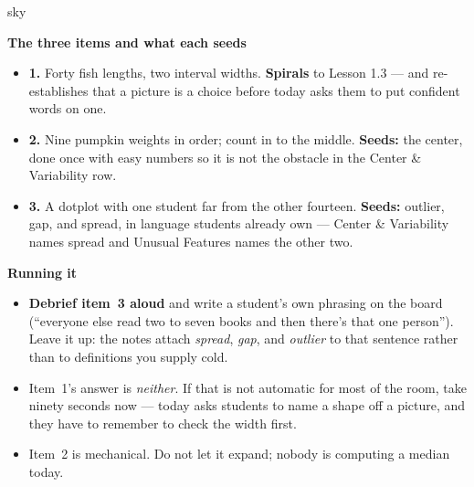 \documentclass[10pt]{article}
\begin{document}
\boxguard[20]
\begin{skillbox}{sky}
\begin{minipage}[t]{0.48\linewidth}
    \textbf{The three items and what each seeds}
    \begin{itemize}
        \item \textbf{1.} Forty fish lengths, two interval widths. \textbf{Spirals} to Lesson
              1.3 --- and re-establishes that a picture is a choice before today asks them to
              put confident words on one.
        \item \textbf{2.} Nine pumpkin weights in order; count in to the middle.
              \textbf{Seeds:} the center, done once with easy numbers so it is not the obstacle
              in the Center \& Variability row.
        \item \textbf{3.} A dotplot with one student far from the other fourteen.
              \textbf{Seeds:} outlier, gap, and spread, in language students already own ---
              Center \& Variability names spread and Unusual Features names the other two.
    \end{itemize}
\end{minipage}
\hfill
\begin{minipage}[t]{0.48\linewidth}
    \textbf{Running it}
    \begin{itemize}
        \item \textbf{Debrief item~3 aloud} and write a student's own phrasing on the board
              (``everyone else read two to seven books and then there's that one
              person''). Leave it up: the notes attach \emph{spread}, \emph{gap}, and
              \emph{outlier} to that sentence rather than to definitions you supply cold.
        \item Item~1's answer is \emph{neither}. If that is not automatic for most of the
              room, take ninety seconds now --- today asks students to name a shape off a
              picture, and they have to remember to check the width first.
        \item Item~2 is mechanical. Do not let it expand; nobody is computing a median today.
    \end{itemize}
\end{minipage}
\end{skillbox}
\end{document}
